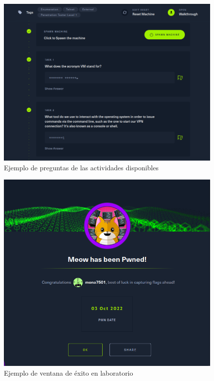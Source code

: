 \documentclass{article}
\begin{document}
        \begin{figure}[!htbp]
            \centering
            \includegraphics[scale=0.35]{img/htb-example-questionnaire.png}
            \caption{Ejemplo de preguntas de las actividades disponibles}
            \label{fig:htb-questionnaire}
        \end{figure}
        
        \begin{figure}[!htbp]
            \centering
            \includegraphics[scale=0.4]{img/htb-example-completion.png}
            \caption{Ejemplo de ventana de éxito en laboratorio}
            \label{fig:htb-completion}
        \end{figure}

    \clearpage
    
    
\end{document}
